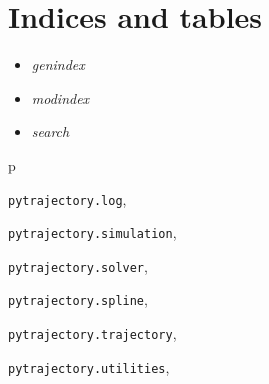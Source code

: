 \documentclass[letterpaper,10pt,english]{sphinxmanual}
\begin{document}
\begin{fulllineitems}
\label{pytrajectory:pytrajectory.log.error}
\end{fulllineitems}



\chapter{Indices and tables}
\label{index:indices-and-tables}\begin{itemize}
\item {} 
\emph{genindex}

\item {} 
\emph{modindex}

\item {} 
\emph{search}

\end{itemize}


\renewcommand{\indexname}{Python Module Index}
\begin{theindex}
\def\bigletter#1{{\Large\sffamily#1}\nopagebreak\vspace{1mm}}
\bigletter{p}
\item {\texttt{pytrajectory.log}}, \pageref{pytrajectory:module-pytrajectory.log}
\item {\texttt{pytrajectory.simulation}}, \pageref{pytrajectory:module-pytrajectory.simulation}
\item {\texttt{pytrajectory.solver}}, \pageref{pytrajectory:module-pytrajectory.solver}
\item {\texttt{pytrajectory.spline}}, \pageref{pytrajectory:module-pytrajectory.spline}
\item {\texttt{pytrajectory.trajectory}}, \pageref{pytrajectory:module-pytrajectory.trajectory}
\item {\texttt{pytrajectory.utilities}}, \pageref{pytrajectory:module-pytrajectory.utilities}
\end{theindex}

\renewcommand{\indexname}{Index}
\printindex
\end{document}
